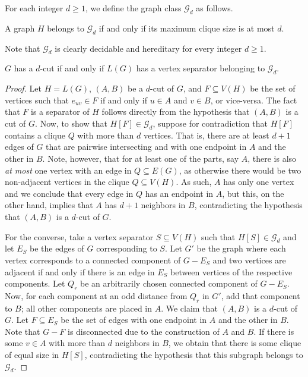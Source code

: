 For each integer $d \geq 1$, we define the graph class $\mathcal{G}_d$ as follows.

\begin{definition}
    A graph $H$ belongs to $\mathcal{G}_d$ if and only if its maximum clique size is at most $d$.
\end{definition}

Note that $\mathcal{G}_d$ is clearly decidable and hereditary for every integer $d \geq 1$.


\begin{lemma}
    \label{lem:cut_mincut}
    $G$ has a $d$-cut if and only if $L(G)$ has a vertex separator belonging to $\mathcal{G}_d$.
\end{lemma}

\begin{proof}
    Let $H = L(G)$, $(A, B)$ be a $d$-cut of $G$, and $F \subseteq V(H)$ be the set of vertices such that $e_{uv} \in F$ if and only if $u \in A$ and $v \in B$, or vice-versa.
    The fact that $F$ is a separator of $H$ follows directly from the hypothesis that $(A, B)$ is a cut of $G$.
    Now, to show that $H[F] \in \mathcal{G}_d$, suppose for contradiction that $H[F]$ contains a  clique $Q$ with more than $d$ vertices.
    That is, there are at least $d+1$ edges of $G$ that are pairwise intersecting and with one endpoint in $A$ and the other in $B$.
    Note, however, that for at least one of the parts, say $A$, there is also \textit{at most} one vertex with an edge in $Q \subseteq E(G)$, as otherwise there would be two non-adjacent vertices in the clique $Q \subseteq V(H)$.
    As such, $A$ has only one vertex and we conclude that every edge in $Q$ has an endpoint in $A$, but this, on the other hand, implies that $A$ has $d+1$ neighbors in $B$, contradicting the hypothesis that $(A, B)$ is a $d$-cut of $G$.


    For the converse, take a vertex separator $S \subseteq V(H)$ such that $H[S] \in \mathcal{G}_d$ and let $E_S$ be the edges of $G$ corresponding to $S$.
    Let $G'$ be the graph where each vertex corresponds to a connected component of $G - E_S$ and two vertices are adjacent if and only if there is an edge in $E_S$ between vertices of the respective components.
    Let $Q_r$ be an arbitrarily chosen connected component of $G - E_S$.
    Now, for each component at an odd distance from $Q_r$ in $G'$, add that component to $B$; all other components are placed in $A$.
    We claim that $(A, B)$ is a $d$-cut of $G$. Let $F \subseteq E_S$ be the set of edges with one endpoint in $A$ and the other in $B$.
    Note that $G - F$ is disconnected due to the construction of $A$ and $B$.
    If there is some $v \in A$ with more than $d$ neighbors in $B$, we obtain that there is some clique of equal size in $H[S]$, contradicting the hypothesis that this subgraph belongs to $\mathcal{G}_d$.
\end{proof}





